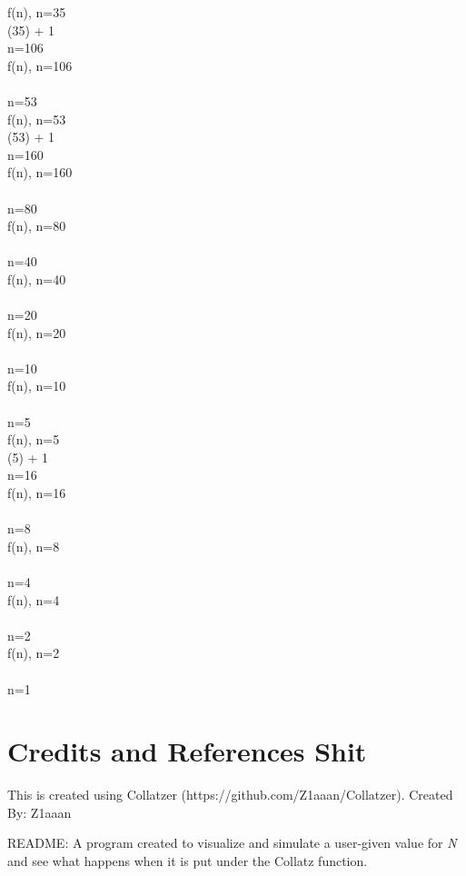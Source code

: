 \documentclass{article}
\begin{document}
f(n), n=35
 \\ 
 (35) + 1
 \\ 
 \Rightarrow n=106
 \\[3mm] 
f(n), n=106
 \\ 
 \Rightarrow {} 
 \\ 
 \Rightarrow n=53
 \\[3mm] 
f(n), n=53
 \\ 
 (53) + 1
 \\ 
 \Rightarrow n=160
 \\[3mm] 
f(n), n=160
 \\ 
 \Rightarrow {} 
 \\ 
 \Rightarrow n=80
 \\[3mm] 
f(n), n=80
 \\ 
 \Rightarrow {} 
 \\ 
 \Rightarrow n=40
 \\[3mm] 
f(n), n=40
 \\ 
 \Rightarrow {} 
 \\ 
 \Rightarrow n=20
 \\[3mm] 
f(n), n=20
 \\ 
 \Rightarrow {} 
 \\ 
 \Rightarrow n=10
 \\[3mm] 
f(n), n=10
 \\ 
 \Rightarrow {} 
 \\ 
 \Rightarrow n=5
 \\[3mm] 
f(n), n=5
 \\ 
 (5) + 1
 \\ 
 \Rightarrow n=16
 \\[3mm] 
f(n), n=16
 \\ 
 \Rightarrow {} 
 \\ 
 \Rightarrow n=8
 \\[3mm] 
f(n), n=8
 \\ 
 \Rightarrow {} 
 \\ 
 \Rightarrow n=4
 \\[3mm] 
f(n), n=4
 \\ 
 \Rightarrow {} 
 \\ 
 \Rightarrow n=2
 \\[3mm] 
f(n), n=2
 \\ 
 \Rightarrow {} 
 \\ 
 \Rightarrow n=1
 \\[3mm] 

    \section{Credits and References Shit}
    This is created using Collatzer (https://github.com/Z1aaan/Collatzer).
    Created By: Z1aaan
    
    README:
    A program created to visualize and simulate a user-given value for \textit{N} 
    and see what happens when it is put under the Collatz function.
    
\end{document}
